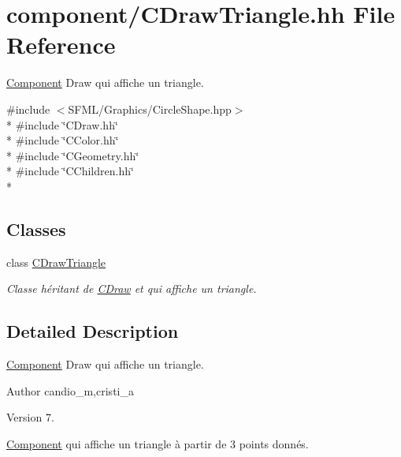 \hypertarget{_c_draw_triangle_8hh}{}\section{component/\+C\+Draw\+Triangle.hh File Reference}
\label{_c_draw_triangle_8hh}


\hyperlink{class_component}{Component} Draw qui affiche un triangle.  


{\ttfamily \#include $<$S\+F\+M\+L/\+Graphics/\+Circle\+Shape.\+hpp$>$}\\*
{\ttfamily \#include \char`\"{}C\+Draw.\+hh\char`\"{}}\\*
{\ttfamily \#include \char`\"{}C\+Color.\+hh\char`\"{}}\\*
{\ttfamily \#include \char`\"{}C\+Geometry.\+hh\char`\"{}}\\*
{\ttfamily \#include \char`\"{}C\+Children.\+hh\char`\"{}}\\*
\subsection*{Classes}
\begin{DoxyCompactItemize}
\item 
class \hyperlink{class_c_draw_triangle}{C\+Draw\+Triangle}
\begin{DoxyCompactList}\small\item\em Classe héritant de \hyperlink{class_c_draw}{C\+Draw} et qui affiche un triangle. \end{DoxyCompactList}\end{DoxyCompactItemize}


\subsection{Detailed Description}
\hyperlink{class_component}{Component} Draw qui affiche un triangle. 

\begin{DoxyAuthor}{Author}
candio\+\_\+m,cristi\+\_\+a 
\end{DoxyAuthor}
\begin{DoxyVersion}{Version}
7.
\end{DoxyVersion}
\hyperlink{class_component}{Component} qui affiche un triangle à partir de 3 points donnés. 